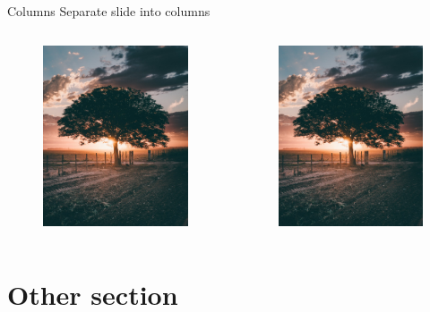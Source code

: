 \documentclass[aspectratio=169,xcolor=dvipsnames]{beamer}
\begin{document}
\begin{frame}{Columns}
    Separate slide into columns
    \begin{columns}
        \begin{figure}
            \includegraphics[width=0.5\linewidth]{2.jpg}
        \end{figure}
        \begin{figure}
            \includegraphics[width=0.5\linewidth]{2.jpg}
        \end{figure}
    \end{columns}
    \end{frame}


\section{Other section}
\end{document}
